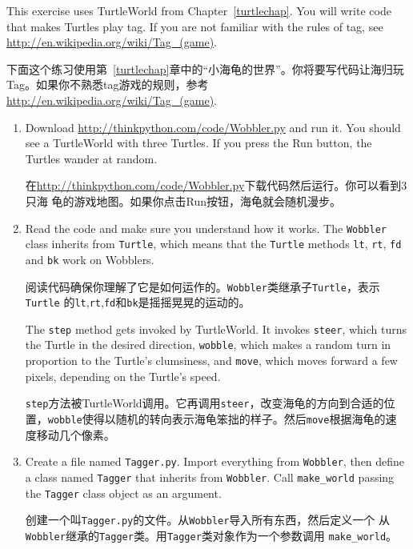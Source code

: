 \documentclass[10pt]{book}
\begin{document}
\begin{CJK}{UTF8}{gbsn}
\begin{exercise}

This exercise uses TurtleWorld from Chapter~\ref{turtlechap}.
You will write code that makes Turtles play tag.  If you
are not familiar with the rules of tag, see
\url{http://en.wikipedia.org/wiki/Tag_(game)}.

下面这个练习使用第~\ref{turtlechap}章中的``小海龟的世界''。你将要写代码让海归玩
Tag。如果你不熟悉tag游戏的规则，参考
\url{http://en.wikipedia.org/wiki/Tag_(game)}.

\begin{enumerate}

\item Download \url{http://thinkpython.com/code/Wobbler.py} and run it.  You
should see a TurtleWorld with three Turtles.  If you press the
{\sf Run} button, the Turtles wander at random.

在\url{http://thinkpython.com/code/Wobbler.py}下载代码然后运行。你可以看到3只海
龟的游戏地图。如果你点击{\sf Run}按钮，海龟就会随机漫步。

\item Read the code and make sure you understand how it works.
The {\tt Wobbler} class inherits from {\tt Turtle}, which means
that the {\tt Turtle} methods {\tt lt}, {\tt rt}, {\tt fd}
and {\tt bk} work on Wobblers.

阅读代码确保你理解了它是如何运作的。{\tt Wobbler}类继承子{\tt Turtle}，表示{\tt Turtle}
的{\tt lt},{\tt rt},{\tt fd}和{\tt bk}是摇摇晃晃的运动的。

The {\tt step} method gets invoked by TurtleWorld.  It invokes 
{\tt steer}, which turns the Turtle in the desired direction,
{\tt wobble}, which makes a random turn in proportion to the Turtle's
clumsiness, and {\tt move}, which moves forward a few pixels,
depending on the Turtle's speed.

{\tt step}方法被TurtleWorld调用。它再调用{\tt steer}，改变海龟的方向到合适的位
置，{\tt wobble}使得以随机的转向表示海龟笨拙的样子。然后{\tt move}根据海龟的速
度移动几个像素。

\item Create a file named {\tt Tagger.py}.  Import everything from
  {\tt Wobbler}, then define a class named {\tt Tagger} that inherits
  from {\tt Wobbler}.  Call \verb"make_world" passing the {\tt Tagger} 
  class object as an argument.

    创建一个叫{\tt Tagger.py}的文件。从{\tt Wobbler}导入所有东西，然后定义一个
    从{\tt Wobbler}继承的{\tt Tagger}类。用{\tt Tagger}类对象作为一个参数调用
    \verb"make_world"。


\end{enumerate}
\end{exercise}
\end{CJK}
\end{document}
